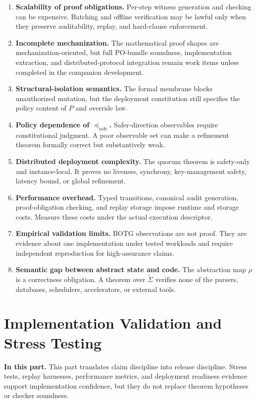 \documentclass[10pt,oneside]{article}
\theoremstyle{definition}
\theoremstyle{remark}
\newcommand{\safe}{\mathrm{safe}}
\newcommand{\PartIntro}[1]{\noindent\textbf{In this part.} #1\par\medskip}
\begin{document}
\begin{enumerate}
  \item \textbf{Scalability of proof obligations.} Per-step witness generation and checking can be expensive. Batching and offline verification may be lawful only when they preserve auditability, replay, and hard-clause enforcement.
  \item \textbf{Incomplete mechanization.} The mathematical proof shapes are mechanization-oriented, but full PO-bundle soundness, implementation extraction, and distributed-protocol integration remain work items unless completed in the companion development.
  \item \textbf{Structural-isolation semantics.} The formal membrane blocks unauthorized mutation, but the deployment constitution still specifies the policy content of \(P\) and override law.
  \item \textbf{Policy dependence of \(\preceq_{\safe}\).} Safer-direction observables require constitutional judgment. A poor observable set can make a refinement theorem formally correct but substantively weak.
  \item \textbf{Distributed deployment complexity.} The quorum theorem is safety-only and instance-local. It proves no liveness, synchrony, key-management safety, latency bound, or global refinement.
  \item \textbf{Performance overhead.} Typed transitions, canonical audit generation, proof-obligation checking, and replay storage impose runtime and storage costs. Measure these costs under the actual execution descriptor.
  \item \textbf{Empirical validation limits.} BOTG observations are not proof. They are evidence about one implementation under tested workloads and require independent reproduction for high-assurance claims.
  \item \textbf{Semantic gap between abstract state and code.} The abstraction map \(\rho\) is a correctness obligation. A theorem over \(\widetilde\Sigma\) verifies none of the parsers, databases, schedulers, accelerators, or external tools.
\end{enumerate}

\part{Implementation Validation and Stress Testing}

\PartIntro{This part translates claim discipline into release discipline. Stress tests, replay harnesses, performance metrics, and deployment readiness evidence support implementation confidence, but they do not replace theorem hypotheses or checker soundness.}
\end{document}
